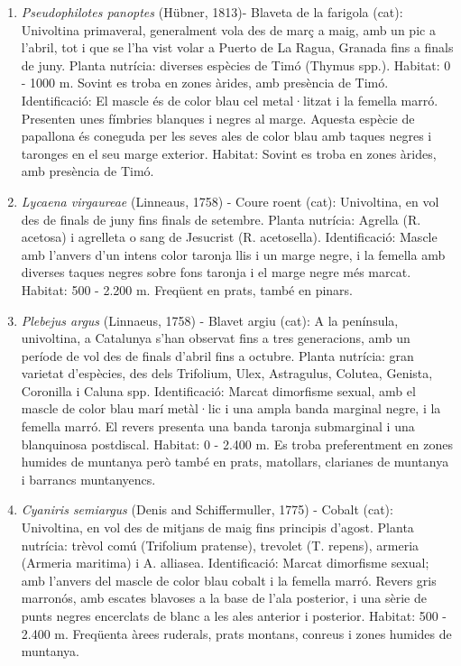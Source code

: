 \documentclass{article}
\begin{document}
\begin{enumerate}
    \item {\it Pseudophilotes panoptes} (Hübner, 1813)- Blaveta de la farigola (cat): Univoltina primaveral, generalment vola des de març a maig, amb un pic a l'abril, tot i que se l'ha vist volar a Puerto de La Ragua, Granada fins a finals de juny. Planta nutrícia: diverses espècies de Timó (Thymus spp.). Habitat: 0 - 1000 m. Sovint es troba en zones àrides, amb presència de Timó. Identificació: El mascle és de color blau cel metal·litzat i la femella marró. Presenten unes fímbries blanques i negres al marge. Aquesta espècie de papallona és coneguda per les seves ales de color blau amb taques negres i taronges en el seu marge exterior. Habitat: Sovint es troba en zones àrides, amb presència de Timó. 
    
    \item {\it Lycaena virgaureae} (Linneaus, 1758) - Coure roent (cat): Univoltina, en vol des de finals de juny fins finals de setembre. Planta nutrícia: Agrella (R. acetosa) i agrelleta o sang de Jesucrist (R. acetosella). Identificació: Mascle amb l'anvers d'un intens color taronja llis i un marge negre, i la femella amb diverses taques negres sobre fons taronja i el marge negre més marcat. Habitat: 500 - 2.200 m. Freqüent en prats, també en pinars. 
    
    \item {\it Plebejus argus} (Linnaeus, 1758) - Blavet argiu (cat): A la península, univoltina, a Catalunya s'han observat fins a tres generacions, amb un període de vol des de finals d'abril fins a octubre. Planta nutrícia: gran varietat d'espècies, des dels Trifolium, Ulex, Astragulus, Colutea, Genista, Coronilla i Caluna spp. Identificació: Marcat dimorfisme sexual, amb el mascle de color blau marí metàl·lic i una ampla banda marginal negre, i la femella marró. El revers presenta una banda taronja submarginal i una blanquinosa postdiscal. Habitat: 0 - 2.400 m. Es troba preferentment en zones humides de muntanya però també en prats, matollars, clarianes de muntanya i barrancs muntanyencs.
    
    \item {\it Cyaniris semiargus} (Denis and Schiffermuller, 1775) - Cobalt (cat): Univoltina, en vol des de mitjans de maig fins principis d'agost. Planta nutrícia: trèvol comú (Trifolium pratense), trevolet (T. repens), armeria (Armeria maritima) i A. alliasea. Identificació: Marcat dimorfisme sexual; amb l'anvers del mascle de color blau cobalt i la femella marró. Revers gris marronós, amb escates blavoses a la base de l'ala posterior, i una sèrie de punts negres encerclats de blanc a les ales anterior i posterior. Habitat: 500 - 2.400 m. Freqüenta àrees ruderals, prats montans, conreus i zones humides de muntanya.
    

\end{enumerate}
\end{document}
